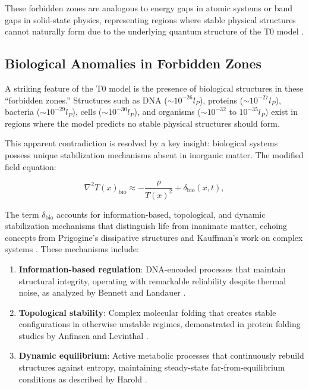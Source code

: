 \documentclass[twocolumn,aps,prl]{revtex4-2}
\begin{document}
	These forbidden zones are analogous to energy gaps in atomic systems or band gaps in solid-state physics, representing regions where stable physical structures cannot naturally form due to the underlying quantum structure of the T0 model \cite{pascher_higgs_2025}.
	
	\subsection{Biological Anomalies in Forbidden Zones}
	\label{subsec:bio_anomalies}
	
	A striking feature of the T0 model is the presence of biological structures in these “forbidden zones.” Structures such as DNA ($\sim 10^{-26} l_P$), proteins ($\sim 10^{-27} l_P$), bacteria ($\sim 10^{-29} l_P$), cells ($\sim 10^{-30} l_P$), and organisms ($\sim 10^{-32}$ to $10^{-35} l_P$) exist in regions where the model predicts no stable physical structures should form.
	
	This apparent contradiction is resolved by a key insight: biological systems possess unique stabilization mechanisms absent in inorganic matter. The modified field equation:
	
	\begin{equation}
		\nabla^2 T(x)_{\text{bio}} \approx -\frac{\rho}{T(x)^2} + \delta_{\text{bio}}(x,t), \label{eq:bio_field_eq}
	\end{equation}
	
	The term $\delta_{\text{bio}}$ accounts for information-based, topological, and dynamic stabilization mechanisms that distinguish life from inanimate matter, echoing concepts from Prigogine’s dissipative structures \cite{Prigogine1980} and Kauffman’s work on complex systems \cite{Kauffman1993}. These mechanisms include:
	
	\begin{enumerate}
		\item \textbf{Information-based regulation}: DNA-encoded processes that maintain structural integrity, operating with remarkable reliability despite thermal noise, as analyzed by Bennett \cite{Bennett1982} and Landauer \cite{Landauer1961}.
		\item \textbf{Topological stability}: Complex molecular folding that creates stable configurations in otherwise unstable regimes, demonstrated in protein folding studies by Anfinsen \cite{Anfinsen1973} and Levinthal \cite{Levinthal1968}.
		\item \textbf{Dynamic equilibrium}: Active metabolic processes that continuously rebuild structures against entropy, maintaining steady-state far-from-equilibrium conditions as described by Harold \cite{Harold2001}.
	\end{enumerate}
	
\end{document}
